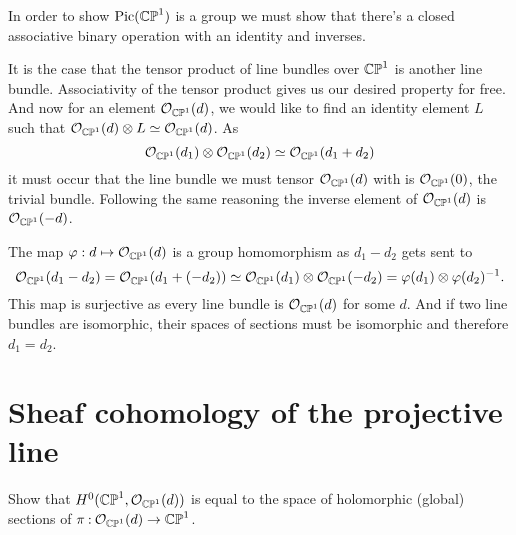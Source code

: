 \documentclass[12pt]{memoir}
\begin{document}
\begin{ptcbr}
    In order to show $\operatorname{Pic}(\mathbb{CP}^1)$ is a group we must show that there's a closed associative binary operation with an identity and inverses.\par
    It is the case that the tensor product of line bundles over $\mathbb{CP}^1$ is another line bundle. Associativity of the tensor product gives us our desired property for free. And now for an element $\mathcal{O}_{\mathbb{CP}^1}(d)$, we would like to find an identity element $L$ such that $\mathcal{O}_{\mathbb{CP}^1}(d)\otimes L\simeq \mathcal{O}_{\mathbb{CP}^1}(d)$. As
    $$\mathcal{O}_{\mathbb{CP}^1}(d_1)\otimes\mathcal{O}_{\mathbb{CP}^1}(d_2)\simeq\mathcal{O}_{\mathbb{CP}^1}(d_1+d_2)$$
    it must occur that the line bundle we must tensor $\mathcal{O}_{\mathbb{CP}^1}(d)$ with is $\mathcal{O}_{\mathbb{CP}^1}(0)$, the trivial bundle. Following the same reasoning the inverse element of $\mathcal{O}_{\mathbb{CP}^1}(d)$ is $\mathcal{O}_{\mathbb{CP}^1}(-d)$.\par
    The map $\varphi:d\mapsto\mathcal{O}_{\mathbb{CP}^1}(d)$ is a group homomorphism as $d_1-d_2$ gets sent to
    $$\mathcal{O}_{\mathbb{CP}^1}(d_1-d_2)=\mathcal{O}_{\mathbb{CP}^1}(d_1+(-d_2))\simeq\mathcal{O}_{\mathbb{CP}^1}(d_1)\otimes\mathcal{O}_{\mathbb{CP}^1}(-d_2)=\varphi(d_1)\otimes\varphi(d_2)^{-1}.$$
    This map is surjective as every line bundle is $\mathcal{O}_{\mathbb{CP}^1}(d)$ for some $d$. And if two line bundles are isomorphic, their spaces of sections must be isomorphic and therefore $d_1=d_2$.
\end{ptcbr}

\section{Sheaf cohomology of the projective line}

\begin{Ej}
    Show that $H^0(\mathbb{CP}^1,\mathcal{O}_{\mathbb{CP}^1}(d))$ is equal to the space of holomorphic (global) sections of $\pi\mathbin{:}\mathcal{O}_{\mathbb{CP}^1}(d)\to\mathbb{CP}^1$.
\end{Ej}
\end{document}

